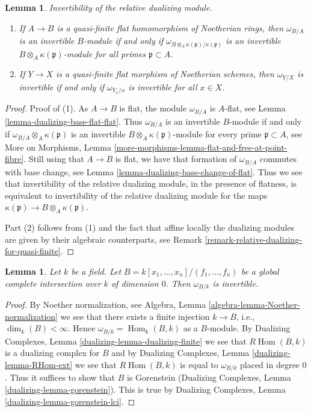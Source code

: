 \documentclass{stacks-project}
\theoremstyle{plain}
\newtheorem{lemma}[subsection]{Lemma}
\theoremstyle{definition}
\theoremstyle{remark}
\numberwithin{equation}{subsection}
\def\Hom{\mathop{\mathrm{Hom}}\nolimits}
\begin{document}
\begin{lemma}
\label{lemma-characterize-invertible}
Invertibility of the relative dualizing module.
\begin{enumerate}
\item If $A \to B$ is a quasi-finite flat homomorphism of Noetherian rings,
then $\omega_{B/A}$ is an invertible $B$-module if and only if
$\omega_{B \otimes_A \kappa(\mathfrak p)/\kappa(\mathfrak p)}$
is an invertible $B \otimes_A \kappa(\mathfrak p)$-module
for all primes $\mathfrak p \subset A$.
\item If $Y \to X$ is a quasi-finite flat morphism of
Noetherian schemes, then $\omega_{Y/X}$ is invertible
if and only if $\omega_{Y_x/x}$ is invertible for all $x \in X$.
\end{enumerate}
\end{lemma}

\begin{proof}
Proof of (1). As $A \to B$ is flat, the module
$\omega_{B/A}$ is $A$-flat, see Lemma \ref{lemma-dualizing-base-flat-flat}.
Thus $\omega_{B/A}$ is an invertible $B$-module if and only if
$\omega_{B/A} \otimes_A \kappa(\mathfrak p)$
is an invertible $B \otimes_A \kappa(\mathfrak p)$-module for
every prime $\mathfrak p \subset A$, see More on Morphisms, Lemma
\ref{more-morphisms-lemma-flat-and-free-at-point-fibre}.
Still using that $A \to B$ is flat, we have that
formation of $\omega_{B/A}$ commutes with base change, see
Lemma \ref{lemma-dualizing-base-change-of-flat}.
Thus we see that invertibility of the relative dualizing module,
in the presence of flatness, is equivalent to invertibility
of the relative dualizing module for the maps
$\kappa(\mathfrak p) \to B \otimes_A \kappa(\mathfrak p)$.

\medskip\noindent
Part (2) follows from (1) and the fact that affine locally
the dualizing modules are given by their algebraic counterparts, see
Remark \ref{remark-relative-dualizing-for-quasi-finite}.
\end{proof}

\begin{lemma}
\label{lemma-dim-zero-global-complete-intersection-over-field}
Let $k$ be a field. Let $B = k[x_1, \ldots, x_n]/(f_1, \ldots, f_n)$
be a global complete intersection over $k$ of dimension $0$.
Then $\omega_{B/k}$ is invertible.
\end{lemma}

\begin{proof}
By Noether normalization, see
Algebra, Lemma \ref{algebra-lemma-Noether-normalization}
we see that there exists a finite injection $k \to B$, i.e.,
$\dim_k(B) < \infty$. Hence $\omega_{B/k} = \Hom_k(B, k)$
as a $B$-module.
By Dualizing Complexes, Lemma \ref{dualizing-lemma-dualizing-finite}
we see that $R\Hom(B, k)$ is a dualizing complex for $B$
and by Dualizing Complexes, Lemma \ref{dualizing-lemma-RHom-ext}
we see that $R\Hom(B, k)$ is equal to $\omega_{B/k}$
placed in degree $0$. Thus it suffices to show that
$B$ is Gorenstein
(Dualizing Complexes, Lemma \ref{dualizing-lemma-gorenstein}).
This is true by Dualizing Complexes, Lemma
\ref{dualizing-lemma-gorenstein-lci}.
\end{proof}
\end{document}
